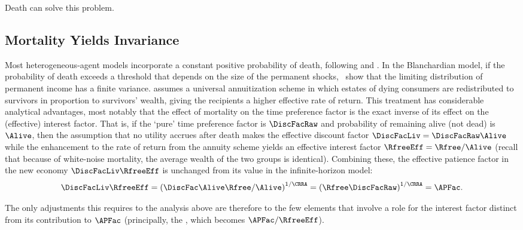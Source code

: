 \documentclass[BufferStockTheory]{subfiles}
\begin{document}
Death can solve this problem.


\hypertarget{Mortality}{}
\subsection{Mortality Yields Invariance}\label{sec:Mortality}

\hypertarget{Blanchard-Lives}{}
Most heterogeneous-agent models incorporate a constant positive probability of death, following \cite{blanchardFinite} and \cite{yaari1965uncertain}.  In the Blanchardian model, if the probability of death exceeds a threshold that depends on the size of the permanent shocks,~\cite{cstwMPC} show that the limiting distribution of permanent income has a finite variance.  \cite{blanchardFinite} assumes a universal annuitization scheme in which estates of dying consumers are redistributed to survivors in proportion to survivors' wealth, giving the recipients a higher effective rate of return. This treatment has considerable analytical advantages, most notably that the effect of mortality on the time preference factor is the exact inverse of its effect on the (effective) interest factor.  That is, if the `pure' time preference factor is $\DiscFacRaw$ and probability of remaining alive (not dead) is $\Alive$, then the assumption that no utility accrues after death makes the effective discount factor $\DiscFacLiv=\DiscFacRaw\Alive$  while the enhancement to the rate of return from the annuity scheme yields an effective interest factor $\RfreeEff=\Rfree/\Alive$ (recall that because of white-noise mortality, the average wealth of the two groups is identical).  Combining these, the effective patience factor in the new economy $\DiscFacLiv \RfreeEff$ is unchanged from its value in the infinite-horizon model:%
\begin{equation}
  \DiscFacLiv \RfreeEff = {\left(\DiscFac \Alive \Rfree / \Alive\right)}^{1/\CRRA} = {\left(\Rfree \DiscFacRaw\right)}^{1/\CRRA} = \APFac.
\end{equation}

The only adjustments this requires to the analysis above are therefore to the few elements that involve a role for the interest factor distinct from its contribution to $\APFac$ (principally, the {\RIC}, which becomes $\APFac/\RfreeEff$).  %
\end{document}
